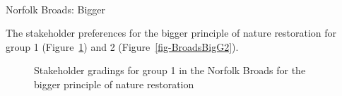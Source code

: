 \documentclass[
  12pt,
  letterpaper,
  DIV=11,
  numbers=noendperiod]{scrartcl}
\makeatletter
\let\oldparagraph\paragraph
\renewcommand{\paragraph}{
    \@ifstar
      \xxxParagraphStar
      \xxxParagraphNoStar
  }
\newcommand{\xxxParagraphStar}[1]{\oldparagraph*{#1}\mbox{}}
\newcommand{\xxxParagraphNoStar}[1]{\oldparagraph{#1}\mbox{}}
\makeatother
\begin{document}
\newpage{}

\paragraph{Norfolk Broads: Bigger}\label{norfolk-broads-bigger}

The stakeholder preferences for the bigger principle of nature
restoration for group 1 (Figure~\ref{fig-BroadsBigG1}) and 2
(Figure~\ref{fig-BroadsBigG2}).

\begin{figure}[H]


\caption{\label{fig-BroadsBigG1}Stakeholder gradings for group 1 in the
Norfolk Broads for the bigger principle of nature restoration}

\end{figure}%
\end{document}
